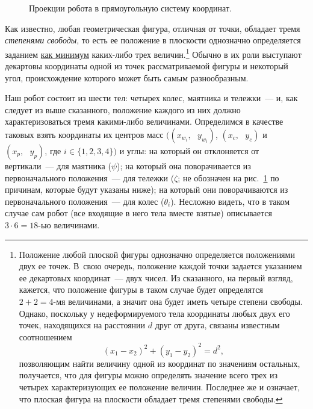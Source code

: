 \documentclass[12pt,a4paper,openany]{extarticle}
\begin{document}
\begin{figure}[h]
	\noindent{}
	\caption{Проекции робота в прямоугольную систему координат.}
	\label{double_cart_in_decart}
\end{figure}

Как известно, любая геометрическая фигура, отличная от точки, обладает тремя \textit{степенями свободы}, то есть ее положение в плоскости однозначно определяется заданием \underline{как минимум} каких-либо трех величин\lefteqn.\footnote{\label{snoska}Положение любой плоской фигуры однозначно определяется положениями двух ее точек. 
В~свою очередь, положение каждой точки задается указанием ее декартовых координат~--- двух чисел.
Из сказанного, на первый взгляд, кажется, что положение фигуры в таком случае будет определятся $2+2=4\text{-мя}$ величинами, а значит она будет иметь четыре степени свободы.
Однако, поскольку у недеформируемого тела координаты любых двух его точек, находящихся на расстоянии $d$ друг от друга, связаны известным соотношением
\begin{equation}\label{in_snoska}
	(x_1 - x_2)^2 + (y_1 - y_2)^2 = d^2\!\!,
\end{equation}
позволяющим найти величину одной из координат по значениям остальных, получается, что для фигуры можно определять значение всего трех из четырех характеризующих ее положение величин.
Последнее же и означает, что плоская фигура на плоскости обладает тремя степенями свободы.}
Обычно в их роли выступают декартовы координаты одной из точек рассматриваемой фигуры и некоторый угол, происхождение которого может быть самым разнообразным.

Наш робот состоит из шести тел: четырех колес, маятника и тележки~--- и, как следует из выше сказанного, положение каждого из них должно характеризоваться тремя какими-либо величинами.
Определимся в качестве таковых взять координаты их центров масс $\bigl((x_{w_i},\text{ }y_{w_i})$, $(x_c,\text{ }y_c)$ и $(x_p,\text{ }y_p)$, где $i\in\{1,2,3,4\}\bigr)$ и углы: на который он отклоняется от вертикали~--- для маятника ($\psi$); на который она поворачивается из первоначального положения~--- для тележки ($\zeta$; не обозначен на рис.~\ref{double_cart_in_decart} по причинам, которые будут указаны ниже); на который они поворачиваются из первоначального положения~--- для колес ($\theta_i$).
Несложно видеть, что в таком случае сам робот (все входящие в него тела вместе взятые) описывается $3 \cdot 6 = 18\text{-ью}$ величинами.
\end{document}
